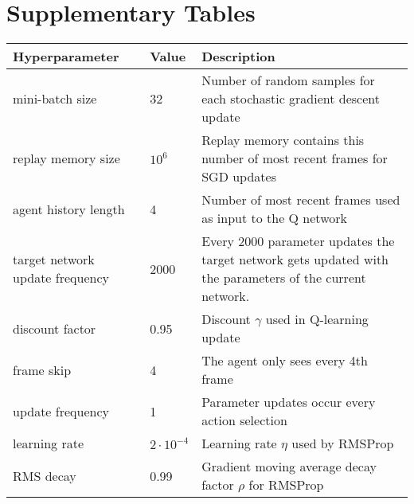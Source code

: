 \chapter{Supplementary Tables}
\label{app:a}

\begin{table}[]
  \vspace{-2cm}
\label{tab:base}
  \renewcommand{\arraystretch}{1.15}
\small
\begin{tabularx}{1.1\linewidth}{ll X}
Hyperparameter                  & Value             & Description                                                                                              \\
  \hline
mini-batch size                 & 32                & Number of random samples for each stochastic gradient descent update                                     \\
replay memory size              & $10^6$            & Replay memory contains this number of most recent frames for SGD updates                                 \\
agent history length            & 4                 & Number of most recent frames used as input to the Q network                                              \\
target network update frequency & 2000             & Every 2000 parameter updates the target network gets updated with the parameters of the current network. \\
discount factor                 & 0.95              & Discount $\gamma$ used in Q-learning update                                                              \\
frame skip                      & 4                 & The agent only sees every 4th frame                                                                      \\
update frequency                & 1                 & Parameter updates occur every action selection                                                           \\
learning rate                   & $2 \cdot 10^{-4}$ & Learning rate $\eta$ used by RMSProp                                                                     \\
RMS decay                       & 0.99              & Gradient moving average decay factor $\rho$ for RMSProp                                                  \\

\end{tabularx}
\end{table}
